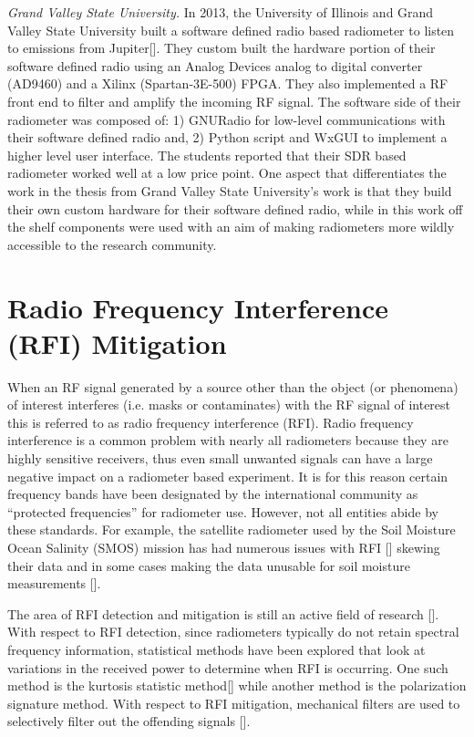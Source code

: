 \emph{Grand Valley State University.}  In 2013, the University of Illinois and Grand Valley State University built a software defined radio based radiometer to listen to emissions from Jupiter[\cite{Behnke}].  They custom built the hardware portion of their software defined radio using an Analog Devices analog to digital converter (AD9460) and a Xilinx (Spartan-3E-500) FPGA.  They also implemented a RF front end to filter and amplify the incoming RF signal.  The software side of their radiometer was composed of: 1) GNURadio for low-level communications with their software defined radio and, 2) Python script and WxGUI to implement a higher level user interface.  The students reported that their SDR based radiometer worked well at a low price point.  One aspect that differentiates the work in the thesis from Grand Valley State University's work is that they build their own custom hardware for their software defined radio, while in this work off the shelf components were used with an aim of making radiometers more wildly accessible to the research community.

\section{Radio Frequency Interference (RFI) Mitigation}
When an RF signal generated by a source other than the object (or phenomena) of interest interferes (i.e. masks or contaminates) with the RF signal of interest this is referred to as radio frequency interference (RFI).  Radio frequency interference is a common problem with nearly all radiometers because they are highly sensitive receivers, thus even small unwanted signals can have a large negative impact on a radiometer based experiment.  It is for this reason certain frequency bands have been designated by the international community as ``protected frequencies'' for radiometer use.  However, not all entities abide by these standards.  For example, the satellite radiometer used by the Soil Moisture Ocean Salinity (SMOS) mission has had numerous issues with RFI [\cite{Kerr}] skewing their data and in some cases making the data unusable for soil moisture measurements [\cite{Richaume}].  

The area of RFI detection and mitigation is still an active field of research [\cite{Forte}].  With respect to RFI detection, since radiometers typically do not retain spectral frequency information, statistical methods have been explored that look at variations in the received power to determine when RFI is occurring.  One such method is the kurtosis statistic method[\cite{DeRoo}] while another method is the polarization signature method.  With respect to RFI mitigation, mechanical filters are used to selectively filter out the offending signals [\cite{DeRooRFI}].  

